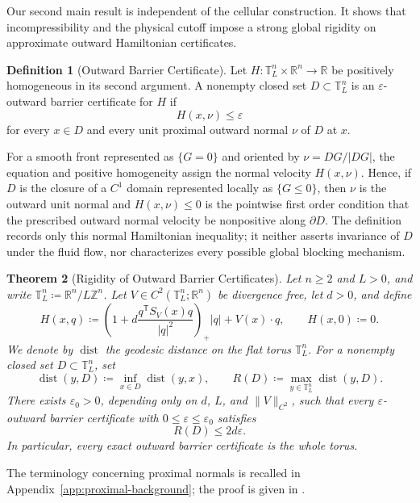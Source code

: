 \documentclass[11pt,reqno,noamsfonts]{amsart}
\newtheorem{theorem}{Theorem}[section]
\theoremstyle{definition}
\newtheorem{definition}[theorem]{Definition}
\theoremstyle{remark}
\newcommand{\T}{\mathbb T}
\newcommand{\dist}{\operatorname{dist}}
\begin{document}
Our second main result is independent of the cellular construction.  It
shows that incompressibility and the physical cutoff impose a strong
global rigidity on approximate outward Hamiltonian certificates.

\begin{definition}[Outward Barrier Certificate]
\label{def:barrier certificate}
Let $H:\T_L^n\times\mathbb R^n\to\mathbb R$ be positively homogeneous
in its second argument.  A nonempty closed set $D\subset\T_L^n$ is an
$\varepsilon$-outward barrier certificate for $H$ if
\[
  H(x,\nu)\le\varepsilon
\]
for every $x\in D$ and every unit proximal outward normal $\nu$ of $D$
at $x$.
\end{definition}

For a smooth front represented as $\{G=0\}$ and oriented by
$\nu=DG/|DG|$, the equation and positive homogeneity assign the normal
velocity $H(x,\nu)$.  Hence, if $D$ is the closure of a $C^1$ domain
represented locally as $\{G\le0\}$, then $\nu$ is the outward unit
normal and $H(x,\nu)\le0$ is the pointwise first order condition that
the prescribed outward normal velocity be nonpositive along
$\partial D$.  The definition records only this normal Hamiltonian
inequality; it neither asserts invariance of $D$ under the fluid flow,
nor characterizes every possible global blocking mechanism.

\begin{theorem}[Rigidity of Outward Barrier Certificates]
\label{thm:no barrier}
Let $n\ge2$ and $L>0$, and write
$\T_L^n\coloneqq\mathbb R^n/L\mathbb Z^n$.  Let
$V\in C^2(\T_L^n;\mathbb R^n)$ be divergence free, let $d>0$, and
define
\[
  H(x,q)
  \coloneqq
  \left(
    1+d\frac{q^{\mathsf T}S_V(x)q}{|q|^2}
  \right)_+|q|
  +V(x)\cdot q,
  \qquad H(x,0)\coloneqq0.
\]
We denote by $\dist$ the geodesic distance on the flat torus
$\T_L^n$. For a nonempty closed set $D\subset\T_L^n$, set
\[
  \dist(y,D)\coloneqq\inf_{x\in D}\dist(y,x),
  \qquad
  R(D)\coloneqq\max_{y\in\T_L^n}\dist(y,D).
\]
There exists $\varepsilon_0>0$, depending only on
$d$, $L$, and $\|V\|_{C^2}$, such that every
$\varepsilon$-outward barrier certificate with
$0\le\varepsilon\le\varepsilon_0$ satisfies
\[
  R(D)\le2d\varepsilon.
\]
In particular, every exact outward barrier certificate is the whole
torus.
\end{theorem}

The terminology concerning proximal normals is recalled in
Appendix~\ref{app:proximal-background}; the proof is given in
.
\end{document}
